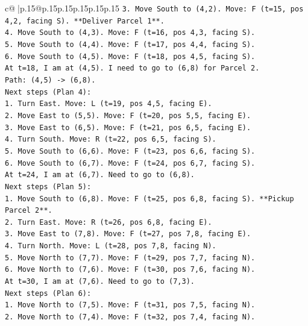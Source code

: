 \documentclass{article}
\begin{document}
{\begin{supertabular}{c@{$\;$}|p{.15\linewidth}@{}p{.15\linewidth}p{.15\linewidth}p{.15\linewidth}p{.15\linewidth}p{.15\linewidth}}
{{{\texttt{3. Move South to (4,2). Move: F (t=15, pos 4,2, facing S). **Deliver Parcel 1**.} \\
\texttt{4. Move South to (4,3). Move: F (t=16, pos 4,3, facing S).} \\
\texttt{5. Move South to (4,4). Move: F (t=17, pos 4,4, facing S).} \\
\texttt{6. Move South to (4,5). Move: F (t=18, pos 4,5, facing S).} \\
\texttt{At t=18, I am at (4,5). I need to go to (6,8) for Parcel 2.} \\
\texttt{Path: (4,5) {-}> (6,8).} \\
\texttt{Next steps (Plan 4):} \\
\texttt{1. Turn East. Move: L (t=19, pos 4,5, facing E).} \\
\texttt{2. Move East to (5,5). Move: F (t=20, pos 5,5, facing E).} \\
\texttt{3. Move East to (6,5). Move: F (t=21, pos 6,5, facing E).} \\
\texttt{4. Turn South. Move: R (t=22, pos 6,5, facing S).} \\
\texttt{5. Move South to (6,6). Move: F (t=23, pos 6,6, facing S).} \\
\texttt{6. Move South to (6,7). Move: F (t=24, pos 6,7, facing S).} \\
\texttt{At t=24, I am at (6,7). Need to go to (6,8).} \\
\texttt{Next steps (Plan 5):} \\
\texttt{1. Move South to (6,8). Move: F (t=25, pos 6,8, facing S). **Pickup Parcel 2**.} \\
\texttt{2. Turn East. Move: R (t=26, pos 6,8, facing E).} \\
\texttt{3. Move East to (7,8). Move: F (t=27, pos 7,8, facing E).} \\
\texttt{4. Turn North. Move: L (t=28, pos 7,8, facing N).} \\
\texttt{5. Move North to (7,7). Move: F (t=29, pos 7,7, facing N).} \\
\texttt{6. Move North to (7,6). Move: F (t=30, pos 7,6, facing N).} \\
\texttt{At t=30, I am at (7,6). Need to go to (7,3).} \\
\texttt{Next steps (Plan 6):} \\
\texttt{1. Move North to (7,5). Move: F (t=31, pos 7,5, facing N).} \\
\texttt{2. Move North to (7,4). Move: F (t=32, pos 7,4, facing N).} \\
}}}
\end{supertabular}}
\end{document}
